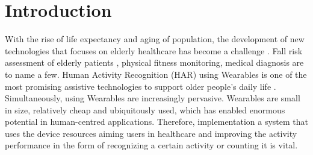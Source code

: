 \documentclass[journal,article,submit,moreauthors,pdftex]{Definitions/mdpi}
\begin{document}


\section{Introduction}

With the rise of life expectancy and aging of population, the development of new technologies that focuses on elderly healthcare has become a challenge \cite{hong2008activity}. Fall risk assessment of elderly patients \cite{sow2013mining}, physical fitness monitoring\cite{morris2014recofit}, medical diagnosis \cite{gonzalez2015features} are to name a few. Human Activity Recognition (HAR) using Wearables is one of the most promising assistive technologies to support older people's daily life \cite{wang2019survey}. Simultaneously, using Wearables are increasingly pervasive. Wearables are small in size, relatively cheap and ubiquitously used, which has enabled enormous potential in human-centred applications. Therefore, implementation a system that uses the device resources aiming users in healthcare and improving the activity performance in the form of recognizing a certain activity or counting it \cite{schilit1994context} is vital.\\
\end{document}
